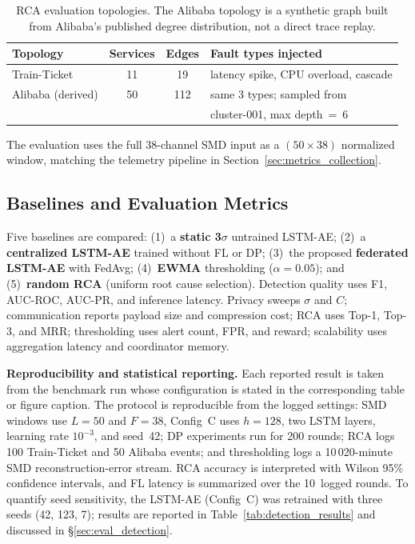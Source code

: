 \begin{table}[H]
    \centering
    \small
    \begin{tabular}{|l|c|c|l|}
        \hline
        \textbf{Topology} & \textbf{Services} & \textbf{Edges}
        & \textbf{Fault types injected} \\
        \hline
        Train-Ticket & 11 & 19 & latency spike, CPU overload, cascade \\
        \hline
        Alibaba (derived) & 50 & 112 & same 3 types; sampled from \\
        & & & cluster-001, max depth~=~6 \\
        \hline
    \end{tabular}
    \caption{RCA evaluation topologies. The Alibaba topology is a synthetic
             graph built from Alibaba's published degree distribution, not a
             direct trace replay.}
    \label{tab:topology_summary}
\end{table}

The evaluation uses the full 38-channel SMD input as a $(50 \times 38)$
normalized window, matching the telemetry pipeline in
Section~\ref{sec:metrics_collection}.

\subsection{Baselines and Evaluation Metrics}
\label{subsec:eval_baselines}

Five baselines are compared: (1)~a \textbf{static 3$\sigma$} untrained
LSTM-AE; (2)~a \textbf{centralized LSTM-AE} trained without FL or DP;
(3)~the proposed \textbf{federated LSTM-AE} with FedAvg;
(4)~\textbf{EWMA} thresholding ($\alpha = 0.05$); and
(5)~\textbf{random RCA} (uniform root cause selection). Detection quality
uses F1, AUC-ROC, AUC-PR, and inference latency. Privacy sweeps $\sigma$
and $C$; communication reports payload size and compression cost; RCA uses
Top-1, Top-3, and MRR; thresholding uses alert count, FPR, and reward;
scalability uses aggregation latency and coordinator memory.

\textbf{Reproducibility and statistical reporting.} Each reported result is
taken from the benchmark run whose configuration is stated in the corresponding
table or figure caption. The protocol is reproducible from the logged settings:
SMD windows use $L=50$ and $F=38$, Config~C uses $h=128$, two LSTM layers,
learning rate $10^{-3}$, and seed~42; DP experiments run for 200 rounds; RCA
logs 100 Train-Ticket and 50 Alibaba events; and thresholding logs a
10\,020-minute SMD reconstruction-error stream. RCA accuracy is interpreted
with Wilson 95\% confidence intervals, and FL latency is summarized over the
10~logged rounds. To quantify seed sensitivity, the LSTM-AE (Config~C) was
retrained with three seeds (42, 123, 7); results are reported in
Table~\ref{tab:detection_results} and discussed in
\S\ref{sec:eval_detection}.

